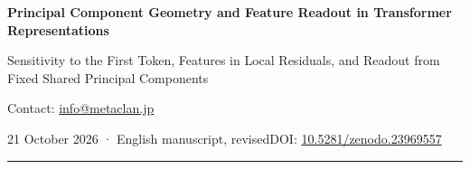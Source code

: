 \documentclass[10pt,a4paper]{article}
\begin{document}
\articlebody\thispagestyle{first}
{\raggedright\sffamily\bfseries\color{ink}\fontsize{22}{27}\selectfont Principal Component Geometry and Feature Readout in Transformer Representations\par}
{\raggedright\sffamily\fontsize{13}{17}\selectfont\color{accent} Sensitivity to the First Token, Features in Local Residuals, and Readout from Fixed Shared Principal Components\par}
\par
{\small Contact: \href{mailto:info@metaclan.jp}{info@metaclan.jp}\par}
{\small 21 October 2026 · English manuscript, revised\quad DOI: \href{https://doi.org/10.5281/zenodo.23969557}{10.5281/zenodo.23969557}\par}\smallskip\hrule\medskip

\end{document}
